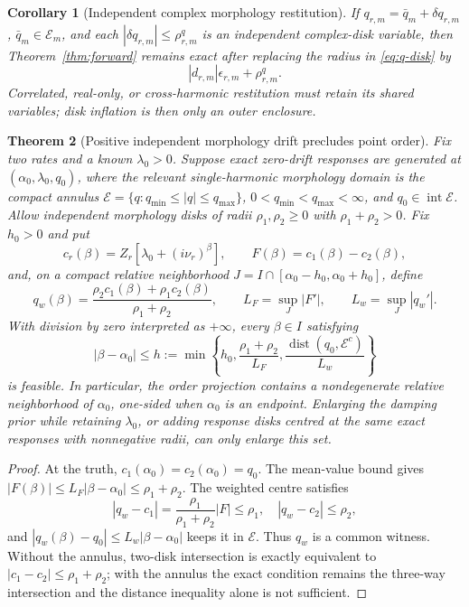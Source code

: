 \documentclass[11pt]{article}
\newtheorem{theorem}{Theorem}
\newtheorem{corollary}[theorem]{Corollary}
\theoremstyle{definition}
\theoremstyle{remark}
\newcommand{\Eset}{\mathcal E}
\begin{document}
\begin{corollary}[Independent complex morphology restitution]
If \(q_{r,m}=\bar q_m+\delta q_{r,m}\),
\(\bar q_m\in\Eset_m\), and each
\(|\delta q_{r,m}|\le\rho^q_{r,m}\) is an independent complex-disk variable,
then Theorem~\ref{thm:forward} remains exact after replacing the radius in
\eqref{eq:q-disk} by
\[
 |d_{r,m}|\epsilon_{r,m}+\rho^q_{r,m}.
\]
Correlated, real-only, or cross-harmonic restitution must retain its shared
variables; disk inflation is then only an outer enclosure.
\end{corollary}

\begin{theorem}[Positive independent morphology drift precludes point order]
\label{thm:drift-resolution}
Fix two rates and a known \(\lambda_0>0\).  Suppose exact zero-drift
responses are generated at \((\alpha_0,\lambda_0,q_0)\), where
the relevant single-harmonic morphology domain is the compact annulus
\(\Eset=\{q:q_{\min}\le|q|\le q_{\max}\}\),
\(0<q_{\min}<q_{\max}<\infty\), and
\(q_0\in\operatorname{int}\Eset\).  Allow independent morphology disks
of radii \(\rho_1,\rho_2\ge0\) with \(\rho_1+\rho_2>0\).  Fix \(h_0>0\) and put
\[
 c_r(\beta)=Z_r[\lambda_0+(i\nu_r)^\beta],\qquad
 F(\beta)=c_1(\beta)-c_2(\beta),
\]
and, on a compact relative neighborhood
\(J=I\cap[\alpha_0-h_0,\alpha_0+h_0]\), define
\[
 q_w(\beta)=\frac{\rho_2c_1(\beta)+\rho_1c_2(\beta)}
                  {\rho_1+\rho_2},\qquad
 L_F=\sup_J|F'|,\qquad L_w=\sup_J|q_w'|.
\]
With division by zero interpreted as \(+\infty\), every
\(\beta\in I\) satisfying
\[
 |\beta-\alpha_0|\le h:=\min\left\{
 h_0,\frac{\rho_1+\rho_2}{L_F},
 \frac{\operatorname{dist}(q_0,\Eset^c)}{L_w}
 \right\}
\]
is feasible.  In particular, the order projection contains a nondegenerate
relative neighborhood of \(\alpha_0\), one-sided when \(\alpha_0\) is an
endpoint.  Enlarging the damping prior while retaining \(\lambda_0\), or
adding response disks centred at the same exact responses with nonnegative
radii, can only enlarge this set.
\end{theorem}
\begin{proof}
At the truth, \(c_1(\alpha_0)=c_2(\alpha_0)=q_0\).  The mean-value bound gives
\(|F(\beta)|\le L_F|\beta-\alpha_0|\le\rho_1+\rho_2\).  The weighted centre
satisfies
\[
 |q_w-c_1|=\frac{\rho_1}{\rho_1+\rho_2}|F|\le\rho_1,
 \quad
 |q_w-c_2|\le\rho_2,
\]
and \(|q_w(\beta)-q_0|\le L_w|\beta-\alpha_0|\) keeps it in \(\Eset\).
Thus \(q_w\) is a common witness.  Without the annulus, two-disk
intersection is exactly equivalent to \(|c_1-c_2|\le\rho_1+\rho_2\); with
the annulus the exact condition remains the three-way intersection and the
distance inequality alone is not sufficient.
\end{proof}
\end{document}
